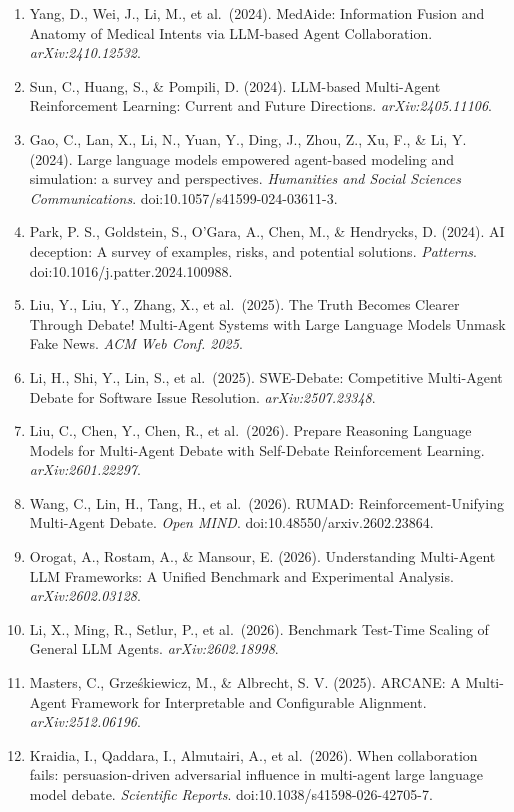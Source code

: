 \begin{enumerate}
\item
  Yang, D., Wei, J., Li, M., et al.~(2024). MedAide: Information Fusion and Anatomy of Medical Intents via LLM-based Agent Collaboration. \emph{arXiv:2410.12532}.
\item
  Sun, C., Huang, S., \& Pompili, D. (2024). LLM-based Multi-Agent Reinforcement Learning: Current and Future Directions. \emph{arXiv:2405.11106}.
\item
  Gao, C., Lan, X., Li, N., Yuan, Y., Ding, J., Zhou, Z., Xu, F., \& Li, Y. (2024). Large language models empowered agent-based modeling and simulation: a survey and perspectives. \emph{Humanities and Social Sciences Communications}. doi:10.1057/s41599-024-03611-3.
\item
  Park, P. S., Goldstein, S., O'Gara, A., Chen, M., \& Hendrycks, D. (2024). AI deception: A survey of examples, risks, and potential solutions. \emph{Patterns}. doi:10.1016/j.patter.2024.100988.
\item
  Liu, Y., Liu, Y., Zhang, X., et al.~(2025). The Truth Becomes Clearer Through Debate! Multi-Agent Systems with Large Language Models Unmask Fake News. \emph{ACM Web Conf. 2025}.
\item
  Li, H., Shi, Y., Lin, S., et al.~(2025). SWE-Debate: Competitive Multi-Agent Debate for Software Issue Resolution. \emph{arXiv:2507.23348}.
\item
  Liu, C., Chen, Y., Chen, R., et al.~(2026). Prepare Reasoning Language Models for Multi-Agent Debate with Self-Debate Reinforcement Learning. \emph{arXiv:2601.22297}.
\item
  Wang, C., Lin, H., Tang, H., et al.~(2026). RUMAD: Reinforcement-Unifying Multi-Agent Debate. \emph{Open MIND}. doi:10.48550/arxiv.2602.23864.
\item
  Orogat, A., Rostam, A., \& Mansour, E. (2026). Understanding Multi-Agent LLM Frameworks: A Unified Benchmark and Experimental Analysis. \emph{arXiv:2602.03128}.
\item
  Li, X., Ming, R., Setlur, P., et al.~(2026). Benchmark Test-Time Scaling of General LLM Agents. \emph{arXiv:2602.18998}.
\item
  Masters, C., Grześkiewicz, M., \& Albrecht, S. V. (2025). ARCANE: A Multi-Agent Framework for Interpretable and Configurable Alignment. \emph{arXiv:2512.06196}.
\item
  Kraidia, I., Qaddara, I., Almutairi, A., et al.~(2026). When collaboration fails: persuasion-driven adversarial influence in multi-agent large language model debate. \emph{Scientific Reports}. doi:10.1038/s41598-026-42705-7.

\end{enumerate}
